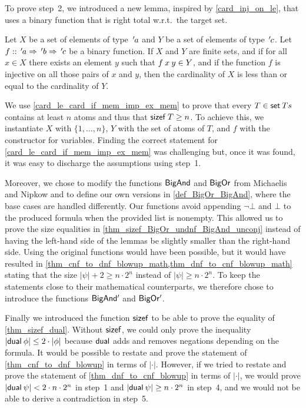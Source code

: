 \documentclass[a4paper,USenglish,cleveref, autoref, thm-restate]{lipics-v2021}
\theoremstyle{definition}
\begin{document}
To prove step~2, we introduced a new lemma, inspired by \cref{card_inj_on_le}, that uses a binary function that is right total w.r.t.\ the target set.

\begin{lemma}
	\label{card_le_card_if_mem_imp_ex_mem}
	Let $X$ be a set of elements of type ${\thinspace'}{\kern-.175ex a}$ and $Y$ be a set of elements of type ${\thinspace'}{\kern-.175ex c}$.
	Let $f \mathrel{::} {\thinspace'}{\kern-.175ex a} \Rightarrow {\thinspace'}{\kern-.05ex b} \Rightarrow {\thinspace'}{\kern-.175ex c}$ be a binary function.
	If $X$ and $Y$ are finite sets, and
	if for all $x \in X$ there exists an element $y$ such that $f \> x \> y \in Y$, and
	if the function $f$ is injective on all those pairs of $x$ and $y$,
	then the cardinality of $X$ is less than or equal to the cardinality of $Y$.
\end{lemma}

We use \cref{card_le_card_if_mem_imp_ex_mem} to prove that every $T \in \mathsf{set} \> Ts$ contains at least $n$ atoms and thus that $\mathsf{sizef} \> T \ge n$.
To achieve this, we instantiate $X$ with $\{1,\ldots,n\}$, $Y$ with the set of atoms of $T$, and $f$ with the constructor for variables.
Finding the correct statement for \cref{card_le_card_if_mem_imp_ex_mem} was challenging but, once it was found, it was easy to discharge the assumptions using step~1.

Moreover, we chose to modify the functions $\mathsf{BigAnd}$ and $\mathsf{BigOr}$ from Michaelis and Nipkow \cite{Propositional_Proof_Systems-AFP} and to define our own versions in \cref{def_BigOr_BigAnd}, where the base cases are handled differently.
Our functions avoid appending $\lnot\bot$ and $\bot$ to the produced formula when the provided list is nonempty.
This allowed us to prove the size equalities in \cref{thm_sizef_BigOr_undnf_BigAnd_unconj} instead of having the left-hand side of the lemmas be slightly smaller than the right-hand side.
Using the original functions would have been possible, but it would have resulted in \cref{thm_cnf_to_dnf_blowup_math,thm_dnf_to_cnf_blowup_math} stating that the size $\left|\psi\right| + 2 \ge n \cdot 2^n$ instead of $\left|\psi\right| \ge n \cdot 2^n$.
To keep the statements close to their mathematical counterparts, we therefore chose to introduce the functions $\mathsf{BigAnd'}$ and $\mathsf{BigOr'}$.

Finally we introduced the function $\mathsf{sizef}$ to be able to prove the equality of \cref{thm_sizef_dual}.
Without $\mathsf{sizef}$, we could only prove the inequality $\left|\mathsf{dual} \> \phi\right| \le 2 \cdot \left|\phi\right|$ because $\mathsf{dual}$ adds and removes negations depending on the formula.
It would be possible to restate and prove the statement of \cref{thm_cnf_to_dnf_blowup} in terms of $\left|\cdot\right|$.
However, if we tried to restate and prove the statement of \cref{thm_dnf_to_cnf_blowup} in terms of $\left|\cdot\right|$, we would prove $\left|\mathsf{dual} \> \psi\right| < 2 \cdot n \cdot 2^n$ in step~1 and $\left|\mathsf{dual} \> \psi\right| \ge n \cdot 2^n$ in step~4, and we would not be able to derive a contradiction in step~5.
\end{document}
